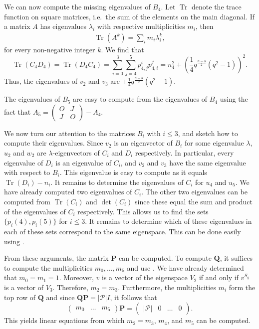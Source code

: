 \documentclass[a4paper]{article}
\theoremstyle{definition}
\newcommand{\pp}{\mathcal P}
\DeclareMathOperator{\Tr}{Tr}
\begin{document}
We can now compute the missing eigenvalues of $B_4$.
Let $\Tr$ denote the trace function on square matrices, i.e.\ the sum of the elements on the main diagonal.
If a matrix $A$ has eigenvalues $\lambda_i$ with respective multiplicities $m_i$, then
\begin{align} \label{Eq:Trace}
 \Tr(A^k) = \sum_i m_i \lambda_i^k,
\end{align}
for every non-negative integer $k$.
We find that
\[
 \Tr(C_4 D_4) = \Tr(D_4 C_4) = \sum_{i=0}^3 \sum_{j=4}^5 p^i_{4,j} p^j_{4,i} = n_4^2 + \left( \frac 14 q^\frac{n-3}2 (q^2-1) \right)^2.
\]
Thus, the eigenvalues of $v_2$ and $v_3$ are $\pm \frac 14 q^\frac{n-3}2 (q^2-1)$.

The eigenvalues of $B_5$ are easy to compute from the eigenvalues of $B_4$ using the fact that $A_5 = \begin{pmatrix} O & J \\ J & O \end{pmatrix} - A_4$.

We now turn our attention to the matrices $B_i$ with $i \leq 3$, and sketch how to compute their eigenvalues.
Since $v_2$ is an eigenvector of $B_i$ for some eigenvalue $\lambda$, $u_2$ and $w_2$ are $\lambda$-eigenvectors of $C_i$ and $D_i$ respectively.
In particular, every eigenvalue of $D_i$ is an eigenvalue of $C_i$, and $v_2$ and $v_3$ have the same eigenvalue with respect to $B_i$.
This eigenvalue is easy to compute as it equals $\Tr(D_i) - n_i$.
It remains to determine the eigenvalues of $C_i$ for $u_4$ and $u_5$.
We have already computed two eigenvalues of $C_i$.
The other two eigenvalues can be computed from $\Tr(C_i)$ and $\det(C_i)$ since these equal the sum and product of the eigenvalues of $C_i$ respectively.
This allows us to find the sets $\{p_i(4), p_i(5)\}$ for $i \leq 3$.
It remains to determine which of these eigenvalues in each of these sets correspond to the same eigenspace.
This can be done easily using .

From these arguments, the matrix $\mathbf P$ can be computed.
To compute $\mathbf Q$, it suffices to compute the multiplicities $m_0, \dots, m_5$ and use .
We have already determined that $m_0 = m_1 = 1$.
Moreover, $v$ is a vector of the eigenspace $V_2$ if and only if $v^{S_q}$ is a vector of $V_3$.
Therefore, $m_2 = m_3$.
Furthermore, the multiplicities $m_i$ form the top row of $\mathbf Q$ and since $\mathbf Q \mathbf P = |\pp| I$, it follows that
\[
 \begin{pmatrix}
  m_0 & \dots & m_5
 \end{pmatrix} \mathbf P = \begin{pmatrix}
  |\pp| & 0 & \dots & 0
 \end{pmatrix}.
\]
This yields linear equations from which $m_2 = m_3$, $m_4$, and $m_5$ can be computed.
\end{document}
